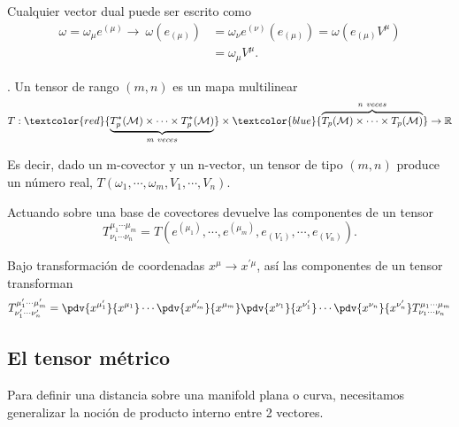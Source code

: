 \documentclass[../main]{subfiles}
\begin{document}
Cualquier vector dual puede ser escrito como 
\begin{equation}
    \begin{split}
        \omega=\omega_{\mu}e^{(\mu)} \rightarrow \ \omega(e_{(\mu)})&=\omega_{\nu}e^{(\nu)}(e_{(\mu)})=\omega(e_{(\mu)}V^{\mu})\\
        &=\omega_{\mu}V^{\mu}.
    \end{split}
\end{equation}

. Un tensor de rango $(m, n)$ es un mapa multilinear
\begin{equation}
    T: \textcolor{red}{\underbrace{T^*_p(\mathcal{M})\times \cdots \times T^*_p(\mathcal{M})}_{m \ veces}} \times \textcolor{blue}{\overbrace{T_p(\mathcal{M})\times \cdots \times T_p(\mathcal{M})}^{n \ veces}} \rightarrow \mathbb{R}
\end{equation}

Es decir, dado un m-covector y un n-vector, un tensor de tipo $(m, n)$ produce un número real, $T(\omega_1, \cdots, \omega_m, V_1, \cdots, V_n)$.

Actuando sobre una base de covectores devuelve las componentes de un tensor
\begin{equation}
    T^{\mu_1 \cdots \mu_m}_{\nu_1 \cdots \nu_n}=T(e^{(\mu_1)}, \cdots, e^{(\mu_m)}, e_{(V_1)}, \cdots, e_{(V_n)}).
\end{equation}

Bajo transformación de coordenadas $x^{\mu} \rightarrow x^{'\mu}$, así las componentes de un tensor transforman 
\begin{equation}
    T^{\mu'_1 \cdots \mu'_m}_{\nu'_1 \cdots \nu'_n}=\pdv{x^{\mu'_1}}{x^{\mu_1}}\cdots \pdv{x^{\mu'_m}}{x^{\mu_m}}\pdv{x^{\nu_1}}{x^{\nu'_1}}\cdots \pdv{x^{\nu_n}}{x^{\nu'_n}}T^{\mu_1 \cdots \mu_m}_{\nu_1 \cdots \nu_n}
\end{equation}

\subsection{El tensor métrico}
Para definir una distancia sobre una manifold plana o curva, necesitamos generalizar la noción de producto interno entre 2 vectores.
\end{document}
